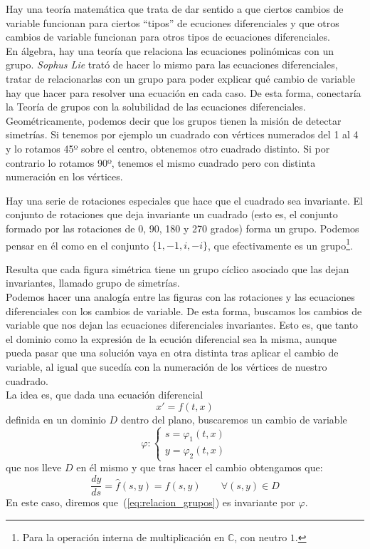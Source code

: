 Hay una teoría matemática que trata de dar sentido a que ciertos cambios de variable funcionan para ciertos ``tipos'' de ecuciones diferenciales y que otros cambios de variable funcionan para otros tipos de ecuaciones diferenciales.\\

En álgebra, hay una teoría que relaciona las ecuaciones polinómicas con un grupo. \emph{Sophus Lie} trató de hacer lo mismo para las ecuaciones diferenciales, tratar de relacionarlas con un grupo para poder explicar qué cambio de variable hay que hacer para resolver una ecuación en cada caso. De esta forma, conectaría la Teoría de grupos con la solubilidad de las ecuaciones diferenciales.\\

Geométricamente, podemos decir que los grupos tienen la misión de detectar simetrías. Si tenemos por ejemplo un cuadrado con vértices numerados del 1 al 4 y lo rotamos 45º sobre el centro, obtenemos otro cuadrado distinto. Si por contrario lo rotamos 90º, tenemos el mismo cuadrado pero con distinta numeración en los vértices.

Hay una serie de rotaciones especiales que hace que el cuadrado sea invariante. El conjunto de rotaciones que deja invariante un cuadrado (esto es, el conjunto formado por las rotaciones de 0, 90, 180 y 270 grados) forma un grupo. Podemos pensar en él como en el conjunto $\{1, -1, i, -i\}$, que efectivamente es un grupo\footnote{Para la operación interna de multiplicación en $\mathbb{C}$, con neutro $1$.}.

Resulta que cada figura simétrica tiene un grupo cíclico asociado que las dejan invariantes, llamado grupo de simetrías.\\

Podemos hacer una analogía entre las figuras con las rotaciones y las ecuaciones diferenciales con los cambios de variable. De esta forma, buscamos los cambios de variable que nos dejan las ecuaciones diferenciales invariantes. Esto es, que tanto el dominio como la expresión de la ecución diferencial sea la misma, aunque pueda pasar que una solución vaya en otra distinta tras aplicar el cambio de variable, al igual que sucedía con la numeración de los vértices de nuestro cuadrado.\\

La idea es, que dada una ecuación diferencial
\begin{equation}\label{eq:relacion_grupos}
    x' = f(t,x)
\end{equation}
definida en un dominio $D$ dentro del plano, buscaremos un cambio de variable 
\begin{equation*}
    \varphi: \left\{\begin{array}{rl}
        s = \varphi_1(t,x) \\
        y = \varphi_2(t,x) 
    \end{array}\right.
\end{equation*}
que nos lleve $D$ en él mismo y que tras hacer el cambio obtengamos que:
\begin{equation*}
    \dfrac{dy}{ds} = \hat{f}(s,y) = f(s,y) \qquad \forall (s,y)\in D
\end{equation*}
En este caso, diremos que~(\ref{eq:relacion_grupos}) es invariante por $\varphi$.


